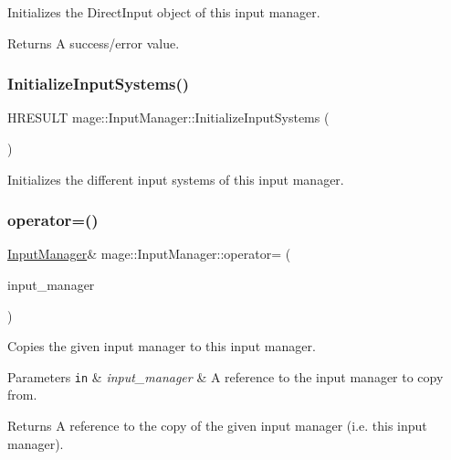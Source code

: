 Initializes the Direct\+Input object of this input manager.

\begin{DoxyReturn}{Returns}
A success/error value. 
\end{DoxyReturn}
\hypertarget{classmage_1_1_input_manager_a34f114c4c667a4a14ce8236b35d308d8}{}\label{classmage_1_1_input_manager_a34f114c4c667a4a14ce8236b35d308d8} 
\subsubsection{\texorpdfstring{Initialize\+Input\+Systems()}{InitializeInputSystems()}}
{\footnotesize\ttfamily H\+R\+E\+S\+U\+LT mage\+::\+Input\+Manager\+::\+Initialize\+Input\+Systems (\begin{DoxyParamCaption}{ }\end{DoxyParamCaption})\hspace{0.3cm}{\ttfamily [private]}}

Initializes the different input systems of this input manager. \hypertarget{classmage_1_1_input_manager_ad9caa8b7e99a69b774887f342bd5dda0}{}\label{classmage_1_1_input_manager_ad9caa8b7e99a69b774887f342bd5dda0} 
\subsubsection{\texorpdfstring{operator=()}{operator=()}\hspace{0.1cm}{\footnotesize\ttfamily [1/2]}}
{\footnotesize\ttfamily \hyperlink{classmage_1_1_input_manager}{Input\+Manager}\& mage\+::\+Input\+Manager\+::operator= (\begin{DoxyParamCaption}\item[{const \hyperlink{classmage_1_1_input_manager}{Input\+Manager} \&}]{input\+\_\+manager }\end{DoxyParamCaption})\hspace{0.3cm}{\ttfamily [delete]}}

Copies the given input manager to this input manager.


\begin{DoxyParams}[1]{Parameters}
\mbox{\tt in}  & {\em input\+\_\+manager} & A reference to the input manager to copy from. \\
\hline
\end{DoxyParams}
\begin{DoxyReturn}{Returns}
A reference to the copy of the given input manager (i.\+e. this input manager). 
\end{DoxyReturn}
\hypertarget{classmage_1_1_input_manager_ae7c1c4d2d55d86cbc88a5fbc2f1279a8}{}\label{classmage_1_1_input_manager_ae7c1c4d2d55d86cbc88a5fbc2f1279a8} 

